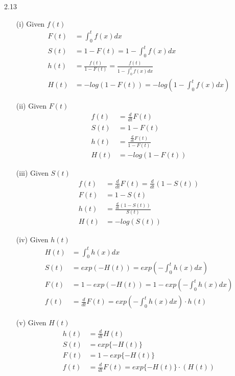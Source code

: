 \documentclass[paper=a4, fontsize=12pt]{scrartcl} %
\numberwithin{equation}{section} %
\numberwithin{figure}{section} %
\numberwithin{table}{section} %
\begin{document}
2.13 
\begin{itemize}
	\item[(i)] {
		Given $f(t)$
		\begin{align*}
			F(t) 	&= 	\int_0^t f(x) dx\\
			S(t) 	&= 	1 - F(t) = 1 - \int_0^t f(x) dx\\
			h(t) 	&=	\frac{f(t)}{1 - F(t)} = \frac{f(t)}{1 -  \int_0^t f(x) dx}\\
			H(t)	&=	-log\left(1-F(t)\right) = -log\left(1 -  \int_0^t f(x) dx \right)
		\end{align*}
	}
	\item[(ii)] {
		Given $F(t)$
		\begin{align*}
			f(t) 	&=	\frac{d}{dt} F(t)\\
			S(t)	&=	1-F(t)\\
			h(t)	&=	\frac{\frac{d}{dt}F(t)}{1-F(t)}\\
			H(t)	&=	-log\left(1-F(t)\right)
		\end{align*}
	}
	\item[(iii)] {
		Given $S(t)$
		\begin{align*}
			f(t)	&=	\frac{d}{dt}F(t) =\frac{d}{dt}(1-S(t))\\
			F(t)	&=	1-S(t)\\
			h(t)	&=	\frac{\frac{d}{dt}(1-S(t))}{S(t)}\\
			H(t)	&=	-log\left(S(t)\right)
		\end{align*}
	}
	\item[(iv)] {
		Given $h(t)$
		\begin{align*}
			H(t)	&=	\int_0^th(x) dx\\
			S(t)	&=	exp(-H(t)) = exp\left(-\int_0^th(x) dx\right)\\
			F(t)	&=	1-exp(-H(t)) = 1- exp\left(-\int_0^th(x) dx\right)\\
			f(t)	&=	\frac{d}{dt}F(t) = exp\left(-\int_0^th(x) dx\right)\cdot h(t)
		\end{align*}
	}
	\item[(v)] {
		Given $H(t)$
		\begin{align*}
			h(t) 	&= 	\frac{d}{dt} H(t)\\
			S(t)	&=	exp\{-H(t)\}\\
			F(t)	&=	1 - exp\{-H(t)\}\\
			f(t)	&=	\frac{d}{dt} F(t) = exp\{-H(t)\}\cdot \left(H(t) \right)
		\end{align*}
	}
\end{itemize}
\end{document}
